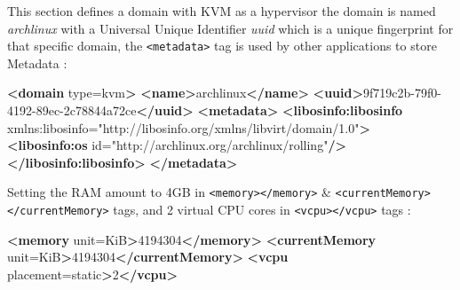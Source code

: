 \documentclass[
  14pt,
  english,
  a4paper,
]{scrreprt}
\newenvironment{Shaded}{}{}
\newcommand{\KeywordTok}[1]{\textcolor[rgb]{0.00,0.44,0.13}{\textbf{#1}}}
\newcommand{\NormalTok}[1]{#1}
\newcommand{\OtherTok}[1]{\textcolor[rgb]{0.00,0.44,0.13}{#1}}
\newcommand{\StringTok}[1]{\textcolor[rgb]{0.25,0.44,0.63}{#1}}
\begin{document}
This section defines a domain with KVM as a hypervisor the domain is
named \emph{archlinux} with a Universal Unique Identifier \emph{uuid}
which is a unique fingerprint for that specific domain, the
\texttt{\textless{}metadata\textgreater{}} tag is used by other
applications to store Metadata :

\begin{Shaded}
\begin{Highlighting}[]
\KeywordTok{\textless{}domain}\OtherTok{ type=}\StringTok{\textquotesingle{}kvm\textquotesingle{}}\KeywordTok{\textgreater{}}
  \KeywordTok{\textless{}name\textgreater{}}\NormalTok{archlinux}\KeywordTok{\textless{}/name\textgreater{}}
  \KeywordTok{\textless{}uuid\textgreater{}}\NormalTok{9f719c2b{-}79f0{-}4192{-}89ec{-}2c78844a72ce}\KeywordTok{\textless{}/uuid\textgreater{}}
  \KeywordTok{\textless{}metadata\textgreater{}}
    \KeywordTok{\textless{}libosinfo:libosinfo}\OtherTok{ xmlns:libosinfo=}\StringTok{"http://libosinfo.org/xmlns/libvirt/domain/1.0"}\KeywordTok{\textgreater{}}
      \KeywordTok{\textless{}libosinfo:os}\OtherTok{ id=}\StringTok{"http://archlinux.org/archlinux/rolling"}\KeywordTok{/\textgreater{}}
    \KeywordTok{\textless{}/libosinfo:libosinfo\textgreater{}}
  \KeywordTok{\textless{}/metadata\textgreater{}}
\end{Highlighting}
\end{Shaded}

Setting the RAM amount to 4GB in
\texttt{\textless{}memory\textgreater{}\textless{}/memory\textgreater{}}
\&
\texttt{\textless{}currentMemory\textgreater{}\textless{}/currentMemory\textgreater{}}
tags, and 2 virtual CPU cores in
\texttt{\textless{}vcpu\textgreater{}\textless{}/vcpu\textgreater{}}
tags :

\begin{Shaded}
\begin{Highlighting}[]
  \KeywordTok{\textless{}memory}\OtherTok{ unit=}\StringTok{\textquotesingle{}KiB\textquotesingle{}}\KeywordTok{\textgreater{}}\NormalTok{4194304}\KeywordTok{\textless{}/memory\textgreater{}}
  \KeywordTok{\textless{}currentMemory}\OtherTok{ unit=}\StringTok{\textquotesingle{}KiB\textquotesingle{}}\KeywordTok{\textgreater{}}\NormalTok{4194304}\KeywordTok{\textless{}/currentMemory\textgreater{}}
  \KeywordTok{\textless{}vcpu}\OtherTok{ placement=}\StringTok{\textquotesingle{}static\textquotesingle{}}\KeywordTok{\textgreater{}}\NormalTok{2}\KeywordTok{\textless{}/vcpu\textgreater{}}
\end{Highlighting}
\end{Shaded}
\end{document}
